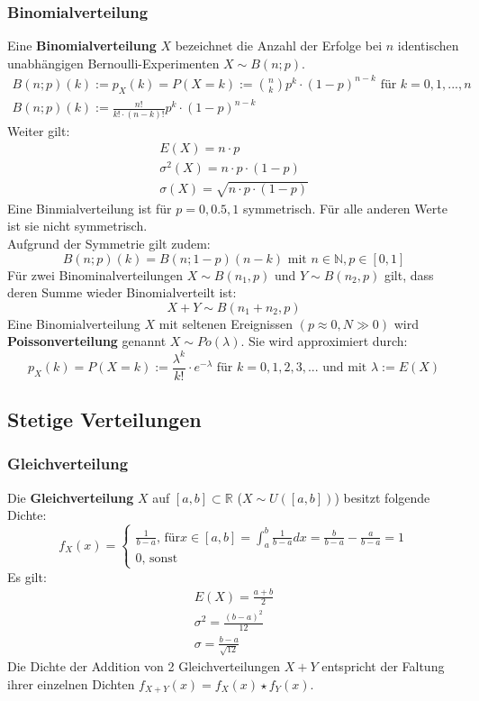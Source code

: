 \documentclass[12pt]{article}
\begin{document}
\subsubsection{Binomialverteilung}
Eine \textbf{Binomialverteilung} $X$ bezeichnet die Anzahl der Erfolge bei $n$ identischen unabhängigen Bernoulli-Experimenten $X \sim B(n;p)$.  
\begin{gather*}
	B(n;p)(k) := p_X(k) = P(X=k):= {n \choose k}p^k\cdot (1-p)^{n-k} \text{ für } k=0,1,...,n \\
	 B(n;p)(k) := \frac{n!}{k!\cdot(n-k)!}p^k\cdot (1-p)^{n-k}
\end{gather*}
Weiter gilt:
\begin{gather*}
	E(X)=n\cdot p\\
	\sigma^2(X)=n\cdot p \cdot (1-p)\\
	\sigma(X)=\sqrt{n\cdot p\cdot (1-p)}
\end{gather*}
Eine Binmialverteilung ist für $p=0,0.5,1$ symmetrisch. Für alle anderen Werte ist sie nicht symmetrisch.\\
Aufgrund der Symmetrie gilt zudem:
\begin{equation*}
	B(n;p)(k) = B(n;1-p)(n-k) \text{ mit } n\in \mathbb{N}, p\in [0,1]
\end{equation*}
Für zwei Binominalverteilungen $X\sim B(n_1,p)$ und $Y\sim B(n_2,p)$ gilt, dass deren Summe wieder Binomialverteilt ist:
\begin{equation*}
	X+Y\sim B(n_1+n_2,p)
\end{equation*}
Eine Binomialverteilung $X$ mit seltenen Ereignissen $(p\approx0, N\gg 0)$ wird \textbf{Poissonverteilung} genannt $X\sim Po(\lambda)$. Sie wird approximiert durch:
\begin{equation*}
	p_X(k)=P(X=k):=\frac{\lambda^k}{k!}\cdot e^{-\lambda} \text{ für } k=0,1,2,3,... \text{ und mit } \lambda:=E(X)
\end{equation*}
\subsection{Stetige Verteilungen}
\subsubsection{Gleichverteilung}
Die \textbf{Gleichverteilung} $X$ auf $[a,b]\subset \mathbb{R}$ ($X\sim U([a,b])$) besitzt folgende Dichte:
\begin{equation*}
	f_X(x)=\begin{cases}
		\frac{1}{b-a} \text{, für} x\in [a,b] = \int_a^b\frac{1}{b-a}dx=\frac{b}{b-a}-\frac{a}{b-a}=1\\
		0\text{, sonst}
	\end{cases}
\end{equation*}
Es gilt:
\begin{gather*}
	E(X)=\frac{a+b}{2}\\
	\sigma^2 =\frac{(b-a)^2}{12}\\
	\sigma = \frac{b-a}{\sqrt{12}}
\end{gather*}
Die Dichte der Addition von 2 Gleichverteilungen $X+Y$ entspricht der Faltung ihrer einzelnen Dichten $f_{X+Y}(x)=f_X(x)\star f_Y(x)$.
\end{document}
